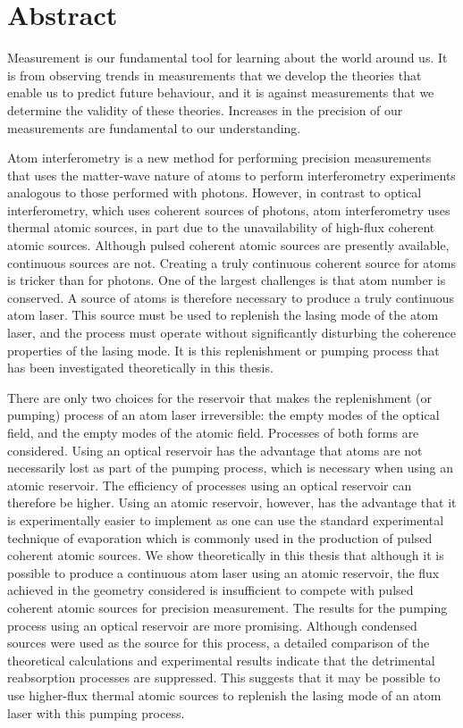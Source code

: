 \chapter*{Abstract}
\graphicspath{{Figures/Common/}}


Measurement is our fundamental tool for learning about the world around us.  It is from observing trends in measurements that we develop the theories that enable us to predict future behaviour, and it is against measurements that we determine the validity of these theories.  Increases in the precision of our measurements are fundamental to our understanding.

Atom interferometry is a new method for performing precision measurements that uses the matter-wave nature of atoms to perform interferometry experiments analogous to those performed with photons.  However, in contrast to optical interferometry, which uses coherent sources of photons, atom interferometry uses thermal atomic sources, in part due to the unavailability of high-flux coherent atomic sources.  Although pulsed coherent atomic sources are presently available, continuous sources are not.  Creating a truly continuous coherent source for atoms is tricker than for photons.  One of the largest challenges is that atom number is conserved.  A source of atoms is therefore necessary to produce a truly continuous atom laser.  This source must be used to replenish the lasing mode of the atom laser, and the process must operate without significantly disturbing the coherence properties of the lasing mode.  It is this replenishment or pumping process that has been investigated theoretically in this thesis.

There are only two choices for the reservoir that makes the replenishment (or pumping) process of an atom laser irreversible: the empty modes of the optical field, and the empty modes of the atomic field.  Processes of both forms are considered.  Using an optical reservoir has the advantage that atoms are not necessarily lost as part of the pumping process, which is necessary when using an atomic reservoir.  The efficiency of processes using an optical reservoir can therefore be higher.  Using an atomic reservoir, however, has the advantage that it is experimentally easier to implement as one can use the standard experimental technique of evaporation which is commonly used in the production of pulsed coherent atomic sources.  We show theoretically in this thesis that although it is possible to produce a continuous atom laser using an atomic reservoir, the flux achieved in the geometry considered is insufficient to compete with pulsed coherent atomic sources for precision measurement.  The results for the pumping process using an optical reservoir are more promising.  Although condensed sources were used as the source for this process, a detailed comparison of the theoretical calculations and experimental results indicate that the detrimental reabsorption processes are suppressed.  This suggests that it may be possible to use higher-flux thermal atomic sources to replenish the lasing mode of an atom laser with this pumping process.